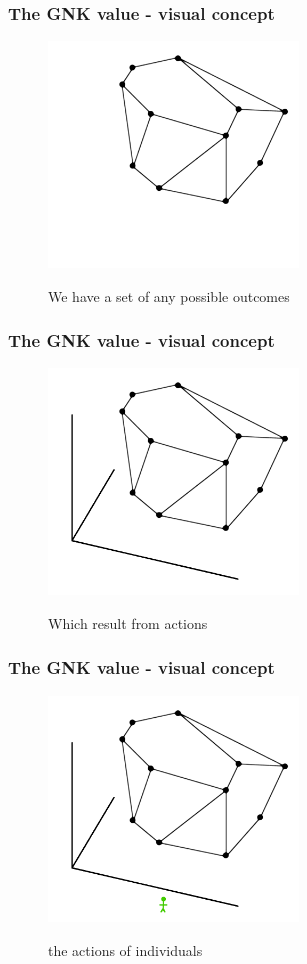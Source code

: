 \documentclass{beamer}
\begin{document}
\begin{frame} \frametitle{The GNK value - visual concept} \begin{figure} \begin{center} \includegraphics[height=6cm]{figs/pp1} \end{center} We have a set of any possible outcomes \end{figure} \end{frame}
\begin{frame} \frametitle{The GNK value - visual concept} \begin{figure} \begin{center} \includegraphics[height=6cm]{figs/pp2} \end{center} Which result from actions \end{figure} \end{frame}
\begin{frame} \frametitle{The GNK value - visual concept} \begin{figure} \begin{center} \includegraphics[height=6cm]{figs/pp3} \end{center} the actions of individuals \end{figure} \end{frame}
\end{document}
